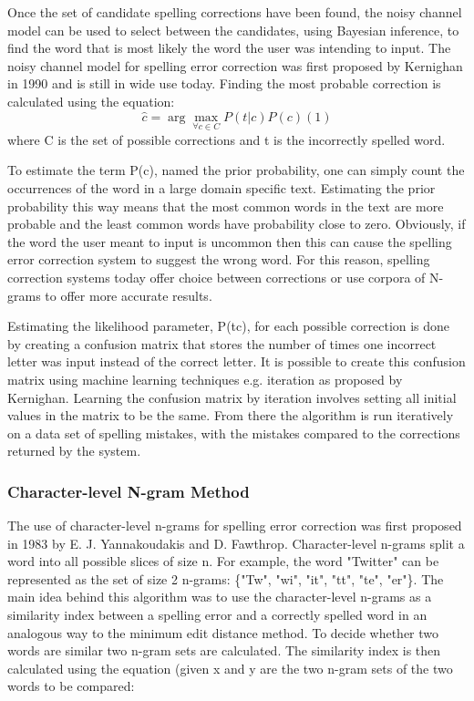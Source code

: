 Once the set of candidate spelling corrections have been found, the noisy channel model can be used to select between the candidates, using Bayesian inference, to find the word that is most likely the word the user was intending to input. The noisy channel model for spelling error correction was first proposed by Kernighan in 1990 \cite{Kernighan1990} and is still in wide use today. Finding the most probable correction is calculated using the equation:
\[
\hat{c} = \arg\max_{\forall c \in C} P(t|c) P(c) (1)
\]
where C is the set of possible corrections and t is the incorrectly spelled word.

To estimate the term P(c), named the prior probability, one can simply count the occurrences of the word in a large domain specific text. Estimating the prior probability this way means that the most common words in the text are more probable and the least common words have probability close to zero. Obviously, if the word the user meant to input is uncommon then this can cause the spelling error correction system to suggest the wrong word. For this reason, spelling correction systems today offer choice between corrections or use corpora of N-grams to offer more accurate results.

Estimating the likelihood parameter, P(t\textbar c), for each possible correction is done by creating a confusion matrix that stores the number of times one incorrect letter was input instead of the correct letter. It is possible to create this confusion matrix using machine learning techniques e.g. iteration as proposed by Kernighan.\cite{Kernighan1990} Learning the confusion matrix by iteration involves setting all initial values in the matrix to be the same. From there the algorithm is run iteratively on a data set of spelling mistakes, with the mistakes compared to the corrections returned by the system.

\subsubsection{Character-level N-gram Method}

The use of character-level n-grams for spelling error correction was first proposed in 1983 by E. J. Yannakoudakis and D. Fawthrop. Character-level n-grams split a word into all possible slices of size n. For example, the word "Twitter" can be represented as the set of size 2 n-grams: \{"Tw", "wi", "it", "tt", "te", "er"\}. The main idea behind this algorithm was to use the character-level n-grams as a similarity index between a spelling error and a correctly spelled word in an analogous way to the minimum edit distance method. To decide whether two words are similar two n-gram sets are calculated. The similarity index is then calculated using the equation (given x and y are the two n-gram sets of the two words to be compared:

